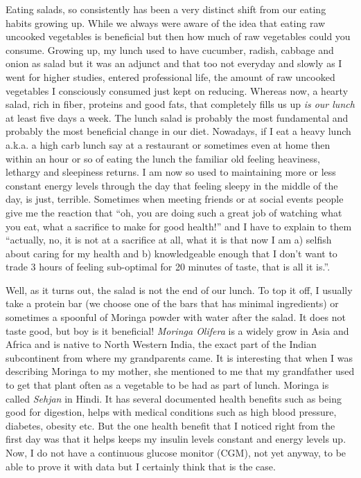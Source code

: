 \documentclass[
  oneside]{book}
\begin{document}
Eating salads, so consistently has been a very distinct shift from our eating habits growing up. While we always were aware of the idea that eating raw uncooked vegetables is beneficial but then how much of raw vegetables could you consume. Growing up, my lunch used to have cucumber, radish, cabbage and onion as salad but it was an adjunct and that too not everyday and slowly as I went for higher studies, entered professional life, the amount of raw uncooked vegetables I consciously consumed just kept on reducing. Whereas now, a hearty salad, rich in fiber, proteins and good fats, that completely fills us up \emph{is our lunch} at least five days a week. The lunch salad is probably the most fundamental and probably the most beneficial change in our diet. Nowadays, if I eat a heavy lunch a.k.a. a high carb lunch say at a restaurant or sometimes even at home then within an hour or so of eating the lunch the familiar old feeling heaviness, lethargy and sleepiness returns. I am now so used to maintaining more or less constant energy levels through the day that feeling sleepy in the middle of the day, is just, terrible. Sometimes when meeting friends or at social events people give me the reaction that ``oh, you are doing such a great job of watching what you eat, what a sacrifice to make for good health!'' and I have to explain to them ``actually, no, it is not at a sacrifice at all, what it is that now I am a) selfish about caring for my health and b) knowledgeable enough that I don't want to trade 3 hours of feeling sub-optimal for 20 minutes of taste, that is all it is.''.

Well, as it turns out, the salad is not the end of our lunch. To top it off, I usually take a protein bar (we choose one of the bars that has minimal ingredients) or sometimes a spoonful of Moringa powder with water after the salad. It does not taste good, but boy is it beneficial! \emph{Moringa Olifera} is a widely grow in Asia and Africa and is native to North Western India, the exact part of the Indian subcontinent from where my grandparents came. It is interesting that when I was describing Moringa to my mother, she mentioned to me that my grandfather used to get that plant often as a vegetable to be had as part of lunch. Moringa is called \emph{Sehjan} in Hindi. It has several documented health benefits such as being good for digestion, helps with medical conditions such as high blood pressure, diabetes, obesity etc. But the one health benefit that I noticed right from the first day was that it helps keeps my insulin levels constant and energy levels up. Now, I do not have a continuous glucose monitor (CGM), not yet anyway, to be able to prove it with data but I certainly think that is the case.
\end{document}
